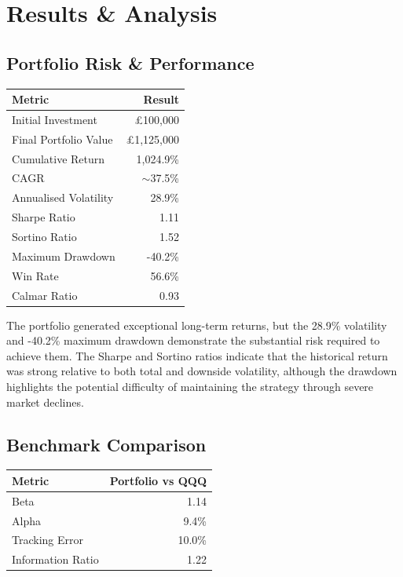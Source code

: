 \documentclass[10pt,a4paper]{article}
\begin{document}
\section{Results \& Analysis}

\subsection{Portfolio Risk \& Performance}

\begin{table}[h]
\centering
\small
\begin{tabular}{lr}
\toprule
\textbf{Metric} & \textbf{Result} \\
\midrule
Initial Investment & £100,000 \\
Final Portfolio Value & £1,125,000 \\
Cumulative Return & 1,024.9\% \\
CAGR & $\sim$37.5\% \\
Annualised Volatility & 28.9\% \\
Sharpe Ratio & 1.11 \\
Sortino Ratio & 1.52 \\
Maximum Drawdown & -40.2\% \\
Win Rate & 56.6\% \\
Calmar Ratio & 0.93 \\
\bottomrule
\end{tabular}
\end{table}

The portfolio generated exceptional long-term returns, but the 28.9\% volatility and -40.2\% maximum drawdown demonstrate the substantial risk required to achieve them. The Sharpe and Sortino ratios indicate that the historical return was strong relative to both total and downside volatility, although the drawdown highlights the potential difficulty of maintaining the strategy through severe market declines.

\subsection{Benchmark Comparison}

\begin{table}[h]
\centering
\small
\begin{tabular}{lr}
\toprule
\textbf{Metric} & \textbf{Portfolio vs QQQ} \\
\midrule
Beta & 1.14 \\
Alpha & 9.4\% \\
Tracking Error & 10.0\% \\
Information Ratio & 1.22 \\
\bottomrule
\end{tabular}
\end{table}
\end{document}
